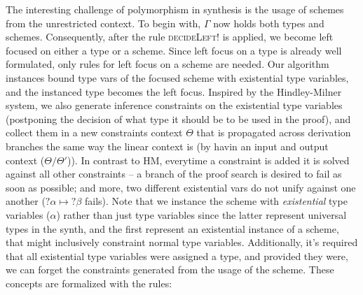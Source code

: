 \documentclass{llncs}
\def\Rho{P}
\begin{document}
The interesting challenge of polymorphism in synthesis is the usage of schemes
from the unrestricted context.  To begin with, $\Gamma$ now holds both types and
schemes. Consequently, after the rule \textsc{decideLeft!} is applied, we become
left focused on either a type or a scheme. Since left focus on a type is already
well formulated, only rules for left focus on a scheme are needed. Our algorithm
instances bound type vars of the focused scheme with existential type variables,
and the instanced type becomes the left focus. Inspired by the Hindley-Milner
system, we also generate inference constraints on the existential type variables
(postponing the decision of what type it should be to be used in the proof), and
collect them in a new constraints context $\Theta$ that is propagated across derivation branches the same way
the linear context is (by havin an input and output context ($\Theta/\Theta'$)).
In contrast to HM, everytime a constraint is added it is solved against all
other constraints -- a branch of the proof search is desired to fail as soon as
possible; and more, two different existential vars do not unify against
one another ($?\alpha \mapsto ?\beta$ fails). Note that we instance the scheme with \emph{existential} type
variables ($\alpha$) rather than just type variables since the latter represent
universal types in the synth, and the first represent an existential instance of
a scheme, that might inclusively constraint normal type variables. Additionally,
it's required that all existential type variables were assigned a type, and
provided they were, we can forget the constraints generated from the usage of
the scheme. These concepts are formalized with the rules:
\end{document}
